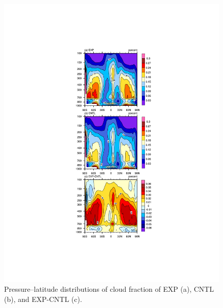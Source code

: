 \documentclass[gmd, manuscript]{copernicus}
\begin{document}
\begin{figure}[t]
\includegraphics[width=15.3cm]{cloud}
\caption{Pressure--latitude distributions of cloud fraction of EXP (a), CNTL (b), and EXP-CNTL (c).}
\end{figure}
\end{document}

